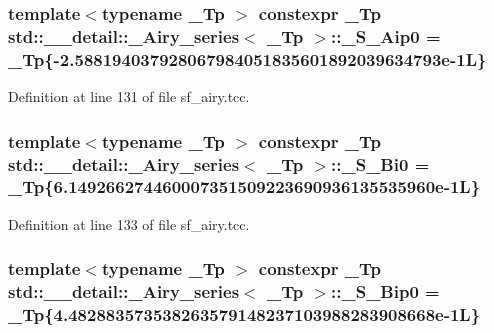 \subsubsection[{\texorpdfstring{\+\_\+\+S\+\_\+\+Aip0}{_S_Aip0}}]{\setlength{\rightskip}{0pt plus 5cm}template$<$typename \+\_\+\+Tp $>$ constexpr \+\_\+\+Tp {\bf std\+::\+\_\+\+\_\+detail\+::\+\_\+\+Airy\+\_\+series}$<$ \+\_\+\+Tp $>$\+::\+\_\+\+S\+\_\+\+Aip0 = \+\_\+\+Tp\{-\/2.\+588194037928067984051835601892039634793e-\/1\+L\}\hspace{0.3cm}{\ttfamily [static]}}\hypertarget{classstd_1_1____detail_1_1__Airy__series_a9a0a96224f581add2488a885f08c810f}{}\label{classstd_1_1____detail_1_1__Airy__series_a9a0a96224f581add2488a885f08c810f}


Definition at line 131 of file sf\+\_\+airy.\+tcc.

\subsubsection[{\texorpdfstring{\+\_\+\+S\+\_\+\+Bi0}{_S_Bi0}}]{\setlength{\rightskip}{0pt plus 5cm}template$<$typename \+\_\+\+Tp $>$ constexpr \+\_\+\+Tp {\bf std\+::\+\_\+\+\_\+detail\+::\+\_\+\+Airy\+\_\+series}$<$ \+\_\+\+Tp $>$\+::\+\_\+\+S\+\_\+\+Bi0 = \+\_\+\+Tp\{6.\+149266274460007351509223690936135535960e-\/1\+L\}\hspace{0.3cm}{\ttfamily [static]}}\hypertarget{classstd_1_1____detail_1_1__Airy__series_a9ad4abe8477f8b28acc85d305f378f82}{}\label{classstd_1_1____detail_1_1__Airy__series_a9ad4abe8477f8b28acc85d305f378f82}


Definition at line 133 of file sf\+\_\+airy.\+tcc.

\subsubsection[{\texorpdfstring{\+\_\+\+S\+\_\+\+Bip0}{_S_Bip0}}]{\setlength{\rightskip}{0pt plus 5cm}template$<$typename \+\_\+\+Tp $>$ constexpr \+\_\+\+Tp {\bf std\+::\+\_\+\+\_\+detail\+::\+\_\+\+Airy\+\_\+series}$<$ \+\_\+\+Tp $>$\+::\+\_\+\+S\+\_\+\+Bip0 = \+\_\+\+Tp\{4.\+482883573538263579148237103988283908668e-\/1\+L\}\hspace{0.3cm}{\ttfamily [static]}}\hypertarget{classstd_1_1____detail_1_1__Airy__series_a153d931f593516a030505f7fd96845e7}{}\label{classstd_1_1____detail_1_1__Airy__series_a153d931f593516a030505f7fd96845e7}


